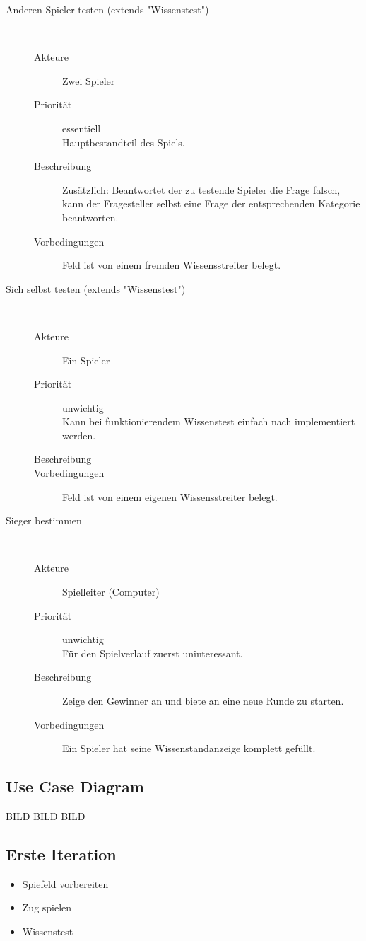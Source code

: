 \documentclass{scrartcl} %
\begin{document}
\begin{description}
   \item[Anderen Spieler testen (extends "Wissenstest")]~\par
   \begin{description}
      \item[Akteure] Zwei Spieler
      \item[Priorität] essentiell\\Hauptbestandteil des Spiels.
      \item[Beschreibung] Zusätzlich: Beantwortet der zu testende Spieler die Frage falsch, kann der Fragesteller selbst eine Frage der entsprechenden Kategorie beantworten.
      \item[Vorbedingungen] Feld ist von einem fremden Wissensstreiter belegt.
   \end{description}
   

   \item[Sich selbst testen (extends "Wissenstest")]~\par
   \begin{description}
      \item[Akteure] Ein Spieler
      \item[Priorität] unwichtig\\Kann bei funktionierendem Wissenstest einfach nach implementiert werden.
      \item[Beschreibung] 
      \item[Vorbedingungen] Feld ist von einem eigenen Wissensstreiter belegt.
   \end{description}
   

   \item[Sieger bestimmen]~\par
   \begin{description}
      \item[Akteure] Spielleiter (Computer)
      \item[Priorität] unwichtig\\Für den Spielverlauf zuerst uninteressant.
      \item[Beschreibung] Zeige den Gewinner an und biete an eine neue Runde zu starten.
      \item[Vorbedingungen] Ein Spieler hat seine Wissenstandanzeige komplett gefüllt.
   \end{description}
\end{description}

\subsection{Use Case Diagram}
BILD BILD BILD

\subsection{Erste Iteration}
\begin{itemize}
   \item Spiefeld vorbereiten
   \item Zug spielen
   \item Wissenstest
\end{itemize}
\end{document}
